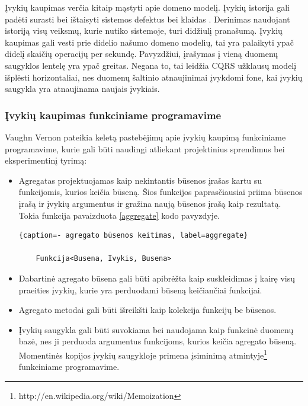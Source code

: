 Įvykių kaupimas verčia kitaip mąstyti apie domeno modelį. Įvykių istorija gali padėti surasti bei ištaisyti sistemos defektus bei klaidas \cite{SeanFitz2012}. Derinimas naudojant istoriją visų veiksmų, kurie nutiko sistemoje, turi didžiulį pranašumą. Įvykių kaupimas gali vesti prie didelio našumo domeno modelių, tai yra palaikyti ypač didelį skaičių operacijų per sekundę. Pavyzdžiui, įrašymas į vieną duomenų saugyklos lentelę yra ypač greitas. Negana to, tai leidžia CQRS užklausų modelį išplėsti horizontaliai, nes duomenų šaltinio atnaujinimai įvykdomi fone, kai įvykių saugykla yra atnaujinama naujais įvykiais.

\subsubsection{Įvykių kaupimas funkciniame programavime}

Vaughn Vernon pateikia keletą pastebėjimų apie įvykių kaupimą funkciniame programavime, kurie gali būti naudingi atliekant projektinius sprendimus bei eksperimentinį tyrimą:

\begin{itemize}

	\item Agregatas projektuojamas kaip nekintantis būsenos įrašas kartu su funkcijomis, kurios keičia būseną. Šios funkcijos paprasčiausiai priima būsenos įrašą ir įvykių argumentus ir gražina naują būsenos įrašą kaip rezultatą. Tokia funkcija pavaizduota \ref{aggregate} kodo pavyzdyje.

\begin{lstlisting}{caption=- agregato būsenos keitimas, label=aggregate}

	Funkcija<Busena, Ivykis, Busena>

\end{lstlisting}

	\item Dabartinė agregato būsena gali būti apibrėžta kaip suskleidimas į kairę visų praeities įvykių, kurie yra perduodami būseną keičiančiai funkcijai.

	\item Agregato metodai gali būti išreikšti kaip kolekcija funkcijų be būsenos.

	\item Įvykių saugykla gali būti suvokiama bei naudojama kaip funkcinė duomenų bazė, nes ji perduoda argumentus funkcijoms, kurios keičia agregato būseną. Momentinės kopijos įvykių saugykloje primena įsiminimą atmintyje\footnote{http://en.wikipedia.org/wiki/Memoization} funkciniame programavime.

\end{itemize}

